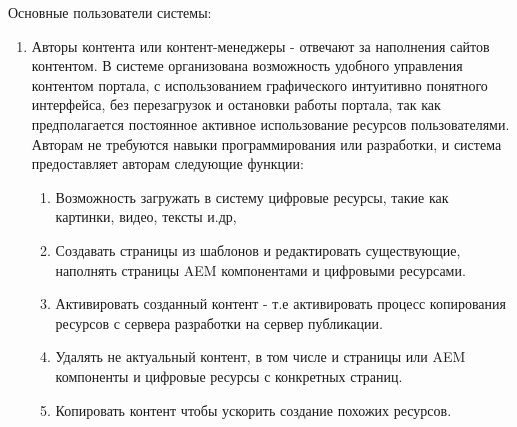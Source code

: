 Основные пользователи системы:
\begin{enumerate}
\item Авторы контента или контент-менеджеры - отвечают за наполнения сайтов контентом. В системе организована возможность удобного управления контентом портала, с использованием графического интуитивно понятного интерфейса, без перезагрузок и остановки работы портала, так как предполагается постоянное активное использование ресурсов пользователями. Авторам не требуются навыки программирования или разработки, и система предоставляет авторам следующие функции:
\begin{enumerate}
\item Возможность загружать в систему цифровые ресурсы, такие как картинки, видео, тексты и.др, 
\item Создавать страницы из шаблонов и редактировать существующие, наполнять страницы AEM компонентами и цифровыми ресурсами. 
\item Активировать созданный контент - т.е активировать процесс копирования ресурсов с сервера разработки на сервер публикации. 
\item Удалять не актуальный контент, в том числе и страницы или AEM компоненты и цифровые ресурсы с конкретных страниц. 
\item Копировать контент чтобы ускорить создание похожих ресурсов.
\end{enumerate}


\end{enumerate}

